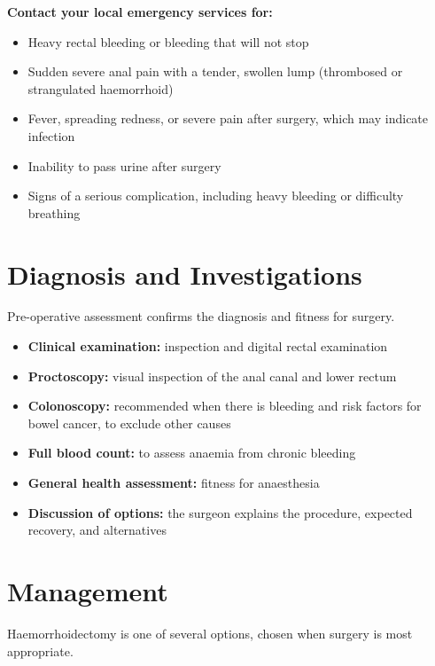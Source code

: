 \textbf{Contact your local emergency services for:}
\begin{itemize}
    \item Heavy rectal bleeding or bleeding that will not stop
    \item Sudden severe anal pain with a tender, swollen lump (thrombosed or strangulated haemorrhoid)
    \item Fever, spreading redness, or severe pain after surgery, which may indicate infection
    \item Inability to pass urine after surgery
    \item Signs of a serious complication, including heavy bleeding or difficulty breathing
\end{itemize}

\section*{Diagnosis and Investigations}
Pre-operative assessment confirms the diagnosis and fitness for surgery.

\begin{itemize}
    \item \textbf{Clinical examination:} inspection and digital rectal examination
    \item \textbf{Proctoscopy:} visual inspection of the anal canal and lower rectum
    \item \textbf{Colonoscopy:} recommended when there is bleeding and risk factors for bowel cancer, to exclude other causes
    \item \textbf{Full blood count:} to assess anaemia from chronic bleeding
    \item \textbf{General health assessment:} fitness for anaesthesia
    \item \textbf{Discussion of options:} the surgeon explains the procedure, expected recovery, and alternatives
\end{itemize}

\section*{Management}
Haemorrhoidectomy is one of several options, chosen when surgery is most appropriate.

